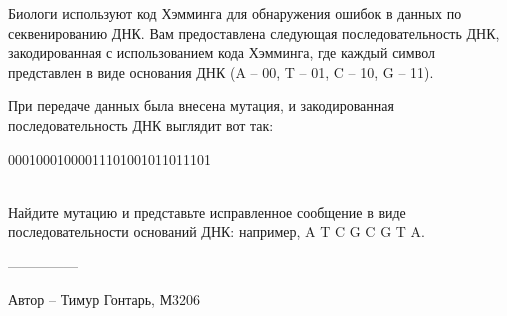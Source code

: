 \question
Биологи используют код Хэмминга для обнаружения ошибок в данных по секвенированию ДНК. Вам предоставлена следующая последовательность ДНК, закодированная с использованием кода Хэмминга, где каждый символ представлен в виде основания ДНК (A -- 00, T -- 01, C -- 10, G -- 11).

При передаче данных была внесена мутация, и закодированная последовательность ДНК выглядит вот так: 
\begin{center}
00010001000011101001011011101
\end{center}
\\
Найдите мутацию и представьте исправленное сообщение в виде последовательности оснований ДНК: например, A T C G C G T A.

---------------

Автор -- Тимур Гонтарь, М3206